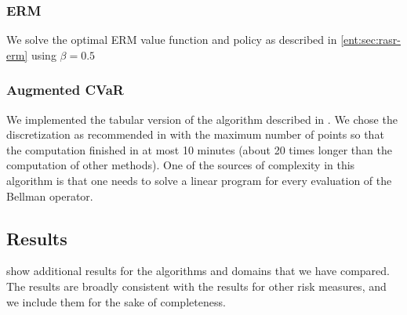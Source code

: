 \documentclass[twoside]{article}
\theoremstyle{plain}
\theoremstyle{definition}
\theoremstyle{remark}
\renewcommand{\cite}[1]{\citep{#1}}
\begin{document}
\subsubsection{ERM}

We solve the optimal ERM value function and policy as described in \cref{ent:sec:rasr-erm} using $\beta=0.5$

\subsubsection{Augmented CVaR}

We implemented the tabular version of the algorithm described in \cite{Chow2015}. We chose the discretization as recommended in \cite{Chow2015} with the maximum number of points so that the computation finished in at most 10 minutes (about 20 times longer than the computation of other methods). One of the sources of complexity in this algorithm is that one needs to solve a linear program for every evaluation of the Bellman operator.

\subsection{Results}

 show additional results for the algorithms and domains that we have compared. The results are broadly consistent with the results for other risk measures, and we include them for the sake of completeness. 
\end{document}

